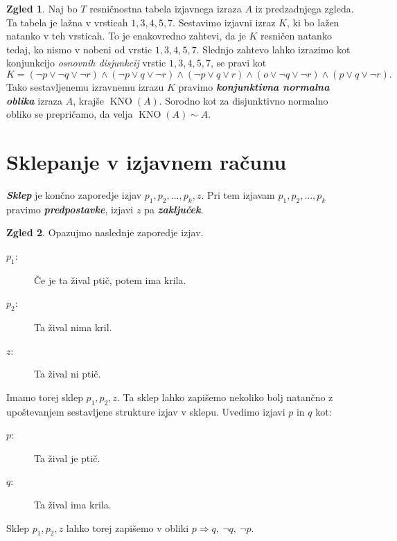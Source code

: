 \documentclass[11pt]{book}
\DeclareMathOperator\KNO{KNO}
\def\definicija{\color{rdeca}\bf\em}
\theoremstyle{definition}
\theoremstyle{zgled}
\newtheorem*{zgled}{Zgled}
\theoremstyle{odprtproblem}
\theoremstyle{domacanaloga}
\theoremstyle{izrek}
\begin{document}
\begin{zgled}
Naj bo $T$ resničnostna tabela izjavnega izraza $A$ iz predzadnjega zgleda. Ta tabela je lažna v vrsticah $1,3,4,5,7$. Sestavimo izjavni izraz $K$, ki bo lažen natanko v teh vrsticah. To je enakovredno zahtevi, da je $K$ resničen natanko tedaj, ko nismo v nobeni od vrstic $1,3,4,5,7$. Slednjo zahtevo lahko izrazimo kot konjunkcijo \emph{osnovnih  disjunkcij} vrstic $1,3,4,5,7$, se pravi kot
\[
    K = 
    (\lnot p \lor \lnot q \lor \lnot r) \land
    (\lnot p \lor q \lor \lnot r) \land
    (\lnot p \lor q \lor r) \land
    (o \lor \lnot q \lor \lnot r) \land
    (p \lor q \lor \lnot r).
\]
Tako sestavljenemu izravnemu izrazu $K$ pravimo {\definicija konjunktivna normalna oblika} izraza $A$, krajše $\KNO(A)$. Sorodno kot za disjunktivno normalno obliko se prepričamo, da velja $\KNO(A) \sim A$.
\end{zgled}

\section{Sklepanje v izjavnem računu}

{\definicija Sklep} je končno zaporedje izjav $p_1, p_2, \dots, p_k, z$. Pri tem izjavam $p_1, p_2, \dots, p_k$ pravimo {\definicija predpostavke}, izjavi $z$ pa {\definicija zaključek}.

\begin{zgled}
Opazujmo naslednje zaporedje izjav.

\begin{description}
    \item[$p_1$:] Če je ta žival ptič, potem ima krila.
    \item[$p_2$:] Ta žival nima kril.
    \item[$z$:] Ta žival ni ptič. 
\end{description}

Imamo torej sklep $p_1, p_2, z$. Ta sklep lahko zapišemo nekoliko bolj natančno z upoštevanjem sestavljene strukture izjav v sklepu. Uvedimo izjavi $p$ in $q$ kot:

\begin{description}
    \item[$p$:] Ta žival je ptič.
    \item[$q$:] Ta žival ima krila.  
\end{description}

Sklep $p_1, p_2, z$ lahko torej zapišemo v obliki $p \Rightarrow q, \ \lnot q, \ \lnot p$.
\end{zgled}
\end{document}
